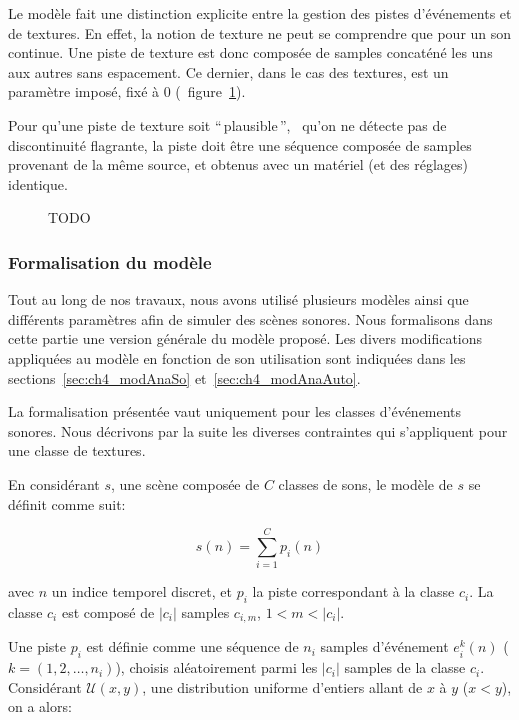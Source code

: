 Le modèle fait une distinction explicite entre la gestion des pistes d'événements et de textures. En effet, la notion de texture ne peut se comprendre que pour un son continue. Une piste de texture est donc composée de samples concaténé les uns aux autres sans espacement. Ce dernier, dans le cas des textures, est un paramètre imposé, fixé à 0 (\cf~figure~\ref{fig:modelSequence}). 

Pour qu'une piste de texture soit ``\,plausible\,'', \ie~qu'on ne détecte pas de discontinuité flagrante, la piste doit être une séquence composée de samples provenant de la même source, et obtenus avec un matériel (et des réglages) identique.

\begin{figure}[bth]
        \graphicspath{{gfx/}}
        \myfloatalign
        \def\svgwidth{\linewidth}
        
       \caption{TODO}\label{fig:modelSequence}
\end{figure}

\subsubsection{Formalisation du modèle}
 \label{sec:ch4_modelForm}
 
 Tout au long de nos travaux, nous avons utilisé plusieurs modèles ainsi que différents paramètres afin de simuler des scènes sonores. Nous formalisons dans cette partie une version générale du modèle proposé. Les divers modifications appliquées au modèle en fonction de son utilisation sont indiquées dans les sections~\ref{sec:ch4_modAnaSo} et~\ref{sec:ch4_modAnaAuto}.
 
La formalisation présentée vaut uniquement pour les classes d'événements sonores. Nous décrivons par la suite les diverses contraintes qui s'appliquent pour une classe de textures.
 
En considérant $s$, une scène composée de $C$ classes de sons, le modèle de $s$ se définit  comme suit:
 
 \begin{equation}
 s(n)=\sum_{i=1}^{C}p_i(n)
 \end{equation}

avec $n$ un indice temporel discret, et $p_i$ la piste correspondant à la classe $c_i$. La classe $c_i$ est composé de $\vert c_i\vert$ samples $c_{i,m}$, $1<m<\vert c_i\vert$. 

Une piste $p_i$ est définie comme une séquence de $n_i$ samples d'événement $e^k_i(n)$ ($k=(1,2,\ldots,n_i)$), choisis aléatoirement parmi les $\vert c_i\vert$ samples de la classe $c_i$. Considérant $\mathcal{U}(x,y)$, une distribution uniforme d'entiers allant de $x$ à $y$ ($x<y$), on a alors:

